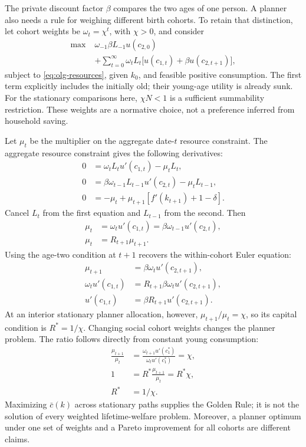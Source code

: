 The private discount factor $\beta$ compares the two ages of one person.
A planner also needs a rule for weighing different birth cohorts. To retain
that distinction, let cohort weights be $\omega_t=\chi^t$, with $\chi>0$,
and consider
\begin{equation}
\begin{split}
\max\;&\omega_{-1}\beta L_{-1}u(c_{2,0})\\
&+\sum_{t=0}^{\infty}\omega_tL_t
 \big[u(c_{1,t})+\beta u(c_{2,t+1})\big],
\end{split}
\end{equation}
subject to \eqref{eq:olg-resources}, given $k_0$, and feasible positive
consumption. The first term explicitly includes the initially old; their
young-age utility is already sunk. For the stationary comparisons here,
$\chi N<1$ is a sufficient summability restriction. These weights are a
normative choice, not a preference inferred from household saving.

Let $\mu_t$ be the multiplier on the aggregate date-$t$ resource constraint.
The aggregate resource constraint gives the following derivatives:
\begin{align}
0&=\omega_tL_tu'(c_{1,t})-\mu_tL_t,\\
0&=\beta\omega_{t-1}L_{t-1}u'(c_{2,t})-\mu_tL_{t-1},\\
0&=-\mu_t+\mu_{t+1}[f'(k_{t+1})+1-\delta].
\end{align}
Cancel $L_t$ from the first equation and $L_{t-1}$ from the second. Then
\begin{align}
\mu_t&=\omega_tu'(c_{1,t})
 =\beta\omega_{t-1}u'(c_{2,t}),\\
\mu_t&=R_{t+1}\mu_{t+1}.
\end{align}
Using the age-two condition at $t+1$ recovers the within-cohort Euler equation:
\begin{align}
\mu_{t+1}&=\beta\omega_tu'(c_{2,t+1}),\\
\omega_tu'(c_{1,t})&=R_{t+1}\beta\omega_tu'(c_{2,t+1}),\\
u'(c_{1,t})&=\beta R_{t+1}u'(c_{2,t+1}).
\end{align}
At an interior stationary planner
allocation, however, $\mu_{t+1}/\mu_t=\chi$, so its capital condition is
$R^*=1/\chi$. Changing social cohort weights changes the planner problem.
The ratio follows directly from constant young consumption:
\begin{align}
\frac{\mu_{t+1}}{\mu_t}
 &=\frac{\omega_{t+1}u'(c_1^*)}{\omega_tu'(c_1^*)}=\chi,\\
1&=R^*\frac{\mu_{t+1}}{\mu_t}=R^*\chi,\\
R^*&=1/\chi.
\end{align}
Maximizing $\bar c(k)$ across stationary paths supplies the Golden Rule;
it is not the solution of every weighted lifetime-welfare problem. Moreover,
a planner optimum under one set of weights and a Pareto improvement for all
cohorts are different claims.

